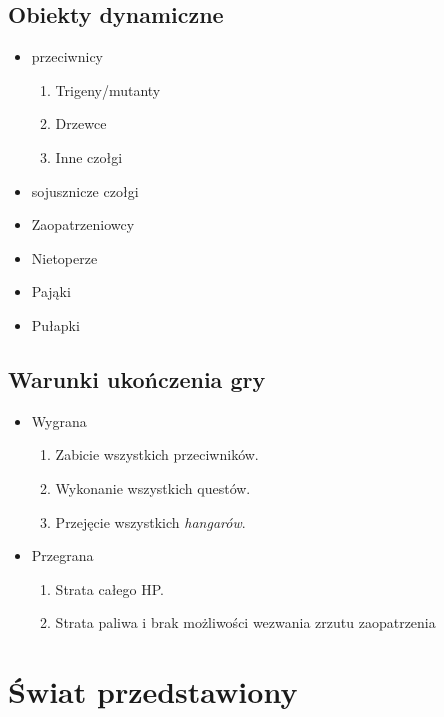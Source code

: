\documentclass{article}
\begin{document}
    \subsection{Obiekty dynamiczne}
    \begin{itemize}
        \item przeciwnicy
        \begin{enumerate}
            \item Trigeny/mutanty
            \item Drzewce
            \item Inne czołgi
        \end{enumerate}
        \item sojusznicze czołgi
        \item Zaopatrzeniowcy
        \item Nietoperze
        \item Pająki
        \item Pułapki
        
    \end{itemize}
    \subsection{Warunki ukończenia gry}
\begin{itemize}
    \item Wygrana
    \begin{enumerate}
        \item Zabicie wszystkich przeciwników.
        \item Wykonanie wszystkich questów.
        \item Przejęcie wszystkich \emph{hangarów}.
    \end{enumerate}
    \item Przegrana
    \begin{enumerate}
        \item Strata całego HP.
        \item Strata paliwa i brak możliwości wezwania zrzutu zaopatrzenia
    \end{enumerate}
\end{itemize}
    
    \newpage
    
   
\section{Świat przedstawiony}
\end{document}
